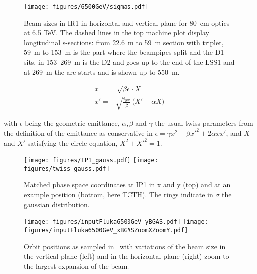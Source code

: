 \begin{figure}%
\begin{center}
  \texttt{[image: figures/6500GeV/sigmas.pdf]}
\end{center}
\vspace{-0.6cm}
 \caption{Beam sizes in IR1 in horizontal and vertical plane for 80~cm optics at 6.5 TeV. The dashed lines in the top machine plot display longitudinal s-sections: from 22.6~m to 59~m section with triplet, 59~m to 153~m is the part where the beampipes split and the D1 sits, in 153--269~m is the D2 and goes up to the end of the LSS1 and at 269~m the arc starts and is shown up to 550~m.
  \label{twissfileBS}}
\end{figure}
 
\begin{equation} \label{eq1}
  \begin{split}
x = & \, \sqrt{\beta \epsilon} \cdot X \\
x' = & \sqrt{\frac{\epsilon_{geo}}{\beta}} \, \big( X' - \alpha X \big)
  \end{split}
\end{equation}

with $\epsilon$ being the geometric emittance, $\alpha, \beta$ and $\gamma$ the usual twiss parameters from the definition of the emittance as conservative in $\epsilon = \gamma x^2 + \beta x'^2 + 2 \alpha x x'$, and $X$ and $X'$ satisfying the circle equation, $X^2 + X'^2 = 1$. 


\begin{figure}%
\begin{center}
\texttt{[image: figures/IP1\_gauss.pdf]}
\texttt{[image: figures/twiss\_gauss.pdf]}
\end{center}
\vspace{-0.6cm}
 \caption{Matched phase space coordinates at IP1 in x and y (top) and at an example position (bottom, here TCTH). The rings indicate in $\sigma$ the gaussian distribution.
  \label{ip1_gauss}}
\end{figure}


\begin{figure}[!htb]
\begin{center}
  \texttt{[image: figures/inputFluka6500GeV\_yBGAS.pdf]}
  \texttt{[image: figures/inputFluka6500GeV\_xBGASZoomXZoomY.pdf]}
\end{center}
\vspace{-0.6cm}
 \caption{Orbit positions as sampled in \fluka~with variations of the beam size in the vertical plane (left) and in the horizontal plane (right) zoom to the largest expansion of the beam.
  \label{BGASflukaInp}}
\end{figure}


